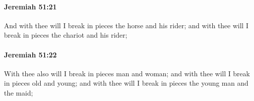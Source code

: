 		\paragraph{Jeremiah 51:21} %
			\label{JEREMIAH-51-21}

			And with thee will I break in pieces the horse and his rider; and with thee will I break in pieces the chariot and his rider;


		\paragraph{Jeremiah 51:22} %
			\label{JEREMIAH-51-22}

			With thee also will I break in pieces man and woman; and with thee will I break in pieces old and young; and with thee will I break in pieces the young man and the maid;


